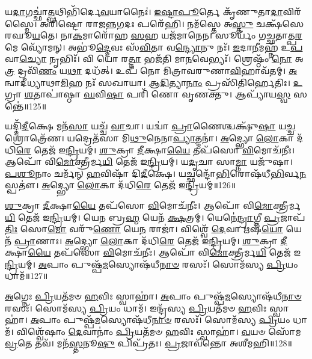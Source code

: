 𑌯\-\ul{𑌦𑌾}\-𑌗𑌚𑍍𑌛𑌾॑\-\ul{𑌤𑍍𑌪}\-𑌥𑌿𑌭𑌿᳴𑌰𑍍𑌦𑍇\-\ul{𑌵}\-𑌯𑌾𑌨𑍈𑌃॑।
\-\ul{𑌇}\-\-\ul{𑌷𑍍𑌟𑌾}\-\-\ul{𑌪𑍂}\-𑌰𑍍𑌤𑍇 𑌕𑍃᳴𑌣𑍁𑌤𑌾\-\ul{𑌦𑌾}\-𑌵𑌿𑌰᳴𑌸𑍍𑌮𑍈।
𑌅𑌰𑌿᳴𑌷𑍍𑌟𑍋 𑌰𑌾𑌜𑌨𑍍𑌨\-\ul{𑌗}\-𑌦𑌃 𑌪𑌰𑍇᳴𑌹𑌿।
𑌨𑌮᳴𑌸𑍍𑌤𑍇 𑌅\-\ul{𑌸𑍍𑌤𑍁} 𑌚𑌕𑍍𑌷᳴𑌸𑍇 𑌰𑌘𑍂\-\ul{𑌯}\-𑌤𑍇।
𑌨𑌾\-\ul{𑌕}\-𑌮𑌾𑌰𑍋᳴𑌹 \ul{𑌸}\-𑌹 𑌯𑌜᳴𑌮𑌾𑌨𑍇𑌨।
𑌸𑍂𑌰𑍍𑌯𑌂᳴ 𑌗𑌚𑍍𑌛𑌤𑌾𑌤𑍍𑌪\-\ul{𑌰}\-𑌮𑍇 𑌵𑍍𑌯𑍋᳴𑌮𑌨𑍍।
𑌅𑌭𑍂॑\-\ul{𑌦𑍍𑌦𑍇}\-𑌵𑌃 𑌸᳴\-\ul{𑌵𑌿}\-𑌤𑌾 𑌵\-\ul{𑌨𑍍𑌦𑍍𑌯𑍋}\-𑌨𑍁 𑌨𑌃᳴।
\-\ul{𑌇}\-𑌦𑌾\-\ul{𑌨𑍀}\-𑌮𑌹𑍍𑌨᳴ 𑌉\-\ul{𑌪}\-𑌵𑌾\-\ul{𑌚𑍍𑌯𑍋} 𑌨𑍃𑌭𑌿𑌃᳴।
𑌵𑌿 𑌯𑍋 𑌰\-\ul{𑌤𑍍𑌨𑌾} 𑌭𑌜᳴𑌤𑌿 𑌮𑌾\-\ul{𑌨}\-𑌵𑍇𑌭𑍍𑌯𑌃᳴।
𑌶𑍍𑌰𑍇𑌷𑍍𑌠𑌂᳴ \ul{𑌨𑍋} 𑌅\-\ul{𑌤𑍍𑌰} 𑌦𑍍𑌰𑌵𑌿᳴\-\ul{𑌣𑌂} 𑌯\-\ul{𑌥𑌾} 𑌦𑌧᳴𑌤𑍍।
𑌉𑌪᳴ 𑌨𑍋 𑌮𑌿𑌤𑍍𑌰𑌾𑌵𑌰𑍁𑌣𑌾\-\ul{𑌵𑌿}\-𑌹𑌾𑌵᳴𑌤𑌮𑍍।
\-\ul{𑌅}\-𑌨𑍍𑌵𑌾𑌦𑍀॑𑌧𑍍𑌯𑌾𑌥𑌾\-\ul{𑌮𑌿}\-𑌹 𑌨𑌃᳴ 𑌸𑌖𑌾𑌯𑌾।
\-\ul{𑌆}\-\-\ul{𑌦𑌿}\-𑌤𑍍𑌯𑌾\-\ul{𑌨𑌾𑌂} 𑌪𑍍𑌰𑌸𑌿᳴𑌤𑌿𑌰𑍍\mbox{}\-\ul{𑌹𑍇}\-𑌤𑌿𑌃।
\-\ul{𑌉}\-𑌗𑍍𑌰𑌾 \ul{𑌶}\-𑌤𑌾𑌪𑌾॑𑌷𑍍𑌠𑌾 \ul{𑌘}\-𑌵𑌿\-\ul{𑌷𑌾} 𑌪𑌰𑌿᳴ 𑌣𑍋 𑌵𑍃𑌣𑌕𑍍𑌤𑍁।
𑌆𑌪𑍍𑌯𑌾᳴𑌯\-\ul{𑌸𑍍𑌵} 𑌸𑌨𑍍𑌤𑍇॑॥125॥\anuvakamend[𑌤𑍍𑌮\-\ul{𑌨𑌾} 𑌜𑌾𑌯᳴𑌮𑌾𑌨𑍋\-𑌽\-\ul{𑌸𑍍𑌯} 𑌦\-\ul{𑌧}\-𑌤𑍍𑌪𑌞𑍍𑌚᳴ 𑌚]

𑌯𑌦𑍍𑌦𑌿᳴\-\ul{𑌦𑍀}\-𑌕𑍍𑌷𑍇 𑌮𑌨᳴\-\ul{𑌸𑌾} 𑌯𑌚𑍍𑌚᳴ \ul{𑌵𑌾}\-𑌚𑌾।
𑌯𑌦𑍍𑌵𑌾॑ \ul{𑌪𑍍𑌰𑌾}\-𑌣𑍈𑌶𑍍𑌚𑌕𑍍𑌷𑍁᳴\-\ul{𑌷𑌾} 𑌯\-\ul{𑌚𑍍𑌚} 𑌶𑍍𑌰𑍋𑌤𑍍𑌰𑍇᳴𑌣।
𑌯𑌦𑍍𑌰𑍇𑌤᳴𑌸𑌾 𑌮𑌿\-\ul{𑌥𑍁}\-𑌨𑍇𑌨𑌾\-\ul{𑌪𑍍𑌯𑌾}\-𑌤𑍍𑌮𑌨𑌾॑।
\-\ul{𑌅}\-𑌦𑍍𑌭𑍍𑌯𑍋 \ul{𑌲𑍋}\-𑌕𑌾 𑌦᳴𑌧𑌿\-\ul{𑌰𑍇} 𑌤𑍇𑌜᳴ 𑌇\-\ul{𑌨𑍍𑌦𑍍𑌰𑌿}\-𑌯𑌮𑍍।
\-\ul{𑌶𑍁}\-𑌕𑍍𑌰𑌾 \ul{𑌦𑍀}\-𑌕𑍍𑌷𑌾\-\ul{𑌯𑍈} 𑌤𑌪᳴𑌸𑍋 \ul{𑌵𑌿}\-𑌮𑍋𑌚᳴𑌨𑍀𑌃।
𑌆𑌪𑍋᳴ 𑌵𑌿\-\ul{𑌮𑍋}\-𑌕𑍍𑌤𑍍𑌰𑍀𑌰𑍍𑌮\-\ul{𑌯𑌿} 𑌤𑍇𑌜᳴ 𑌇\-\ul{𑌨𑍍𑌦𑍍𑌰𑌿}\-𑌯𑌮𑍍।
𑌯\-\ul{𑌦𑍃}\-𑌚𑌾 𑌸𑌾\-\ul{𑌮𑍍𑌨𑌾} 𑌯𑌜𑍁᳴𑌷𑌾।
\-\ul{𑌪}\-\-\ul{𑌶𑍂}\-𑌨𑌾𑌂 𑌚𑌰𑍍𑌮᳴𑌨𑍍 \ul{𑌹}\-𑌵𑌿𑌷𑌾᳴ 𑌦𑌿\-\ul{𑌦𑍀}\-𑌕𑍍𑌷𑍇।
𑌯𑌚𑍍𑌛𑌨𑍍𑌦𑍋᳴\-\ul{𑌭𑌿}\-𑌰𑍋𑌷᳴𑌧𑍀\-\ul{𑌭𑌿}\-𑌰𑍍𑌵\-\ul{𑌨}\-𑌸𑍍𑌪𑌤𑍗॑।
\-\ul{𑌅}\-𑌦𑍍𑌭𑍍𑌯𑍋 \ul{𑌲𑍋}\-𑌕𑌾 𑌦᳴𑌧𑌿\-\ul{𑌰𑍇} 𑌤𑍇𑌜᳴ 𑌇\-\ul{𑌨𑍍𑌦𑍍𑌰𑌿}\-𑌯𑌮𑍍॥126॥

\-\ul{𑌶𑍁}\-𑌕𑍍𑌰𑌾 \ul{𑌦𑍀}\-𑌕𑍍𑌷𑌾\-\ul{𑌯𑍈} 𑌤𑌪᳴𑌸𑍋 \ul{𑌵𑌿}\-𑌮𑍋𑌚᳴𑌨𑍀𑌃।
𑌆𑌪𑍋᳴ 𑌵𑌿\-\ul{𑌮𑍋}\-𑌕𑍍𑌤𑍍𑌰𑍀𑌰𑍍𑌮\-\ul{𑌯𑌿} 𑌤𑍇𑌜᳴ 𑌇\-\ul{𑌨𑍍𑌦𑍍𑌰𑌿}\-𑌯𑌮𑍍।
𑌯𑍇\-\ul{𑌨} 𑌬𑍍𑌰\-\ul{𑌹𑍍𑌮} 𑌯𑍇𑌨᳴ \ul{𑌕𑍍𑌷}\-𑌤𑍍𑌰𑌮𑍍।
𑌯𑍇𑌨𑍇॑\-\ul{𑌨𑍍𑌦𑍍𑌰𑌾}\-𑌗𑍍𑌨𑍀 \ul{𑌪𑍍𑌰}\-𑌜𑌾\-𑌪᳴\-\ul{𑌤𑌿𑌃} 𑌸𑍋\-\ul{𑌮𑍋} 𑌵𑌰𑍁᳴\-\ul{𑌣𑍋} 𑌯𑍇\-\ul{𑌨} 𑌰𑌾𑌜𑌾॑।
𑌵𑌿𑌶𑍍𑌵𑍇᳴ \ul{𑌦𑍇}\-𑌵𑌾 𑌋𑌷᳴\-\ul{𑌯𑍋} 𑌯𑍇𑌨᳴ \ul{𑌪𑍍𑌰𑌾}\-𑌣𑌾𑌃।
\-\ul{𑌅}\-𑌦𑍍𑌭𑍍𑌯𑍋 \ul{𑌲𑍋}\-𑌕𑌾 𑌦᳴𑌧𑌿\-\ul{𑌰𑍇} 𑌤𑍇𑌜᳴ 𑌇\-\ul{𑌨𑍍𑌦𑍍𑌰𑌿}\-𑌯𑌮𑍍।
\-\ul{𑌶𑍁}\-𑌕𑍍𑌰𑌾 \ul{𑌦𑍀}\-𑌕𑍍𑌷𑌾\-\ul{𑌯𑍈} 𑌤𑌪᳴𑌸𑍋 \ul{𑌵𑌿}\-𑌮𑍋𑌚᳴𑌨𑍀𑌃।
𑌆𑌪𑍋᳴ 𑌵𑌿\-\ul{𑌮𑍋}\-𑌕𑍍𑌤𑍍𑌰𑍀𑌰𑍍𑌮\-\ul{𑌯𑌿} 𑌤𑍇𑌜᳴ 𑌇\-\ul{𑌨𑍍𑌦𑍍𑌰𑌿}\-𑌯𑌮𑍍।
\-\ul{𑌅}\-𑌪𑌾𑌂 𑌪𑍁𑌷𑍍𑌪᳴\-\ul{𑌮}\-𑌸𑍍𑌯𑍋𑌷᳴𑌧𑍀\-\ul{𑌨𑌾}\-\-\ul{𑍞} 𑌰𑌸𑌃᳴।
𑌸𑍋𑌮᳴𑌸𑍍𑌯 \ul{𑌪𑍍𑌰𑌿}\-𑌯𑌂 𑌧𑌾𑌮᳴॥127॥

\-\ul{𑌅}\-𑌗𑍍𑌨𑍇𑌃 \ul{𑌪𑍍𑌰𑌿}\-𑌯𑌤᳴𑌮𑍞 \ul{𑌹}\-𑌵𑌿𑌃 𑌸𑍍𑌵𑌾𑌹𑌾॑।
\-\ul{𑌅}\-𑌪𑌾𑌂 𑌪𑍁𑌷𑍍𑌪᳴\-\ul{𑌮}\-𑌸𑍍𑌯𑍋𑌷᳴𑌧𑍀\-\ul{𑌨𑌾}\-\-\ul{𑍞} 𑌰𑌸𑌃᳴।
𑌸𑍋𑌮᳴𑌸𑍍𑌯 \ul{𑌪𑍍𑌰𑌿}\-𑌯𑌂 𑌧𑌾𑌮᳴।
𑌇𑌨𑍍𑌦𑍍𑌰᳴𑌸𑍍𑌯 \ul{𑌪𑍍𑌰𑌿}\-𑌯𑌤᳴𑌮𑍞 \ul{𑌹}\-𑌵𑌿𑌃 𑌸𑍍𑌵𑌾𑌹𑌾॑।
\-\ul{𑌅}\-𑌪𑌾𑌂 𑌪𑍁𑌷𑍍𑌪᳴\-\ul{𑌮}\-𑌸𑍍𑌯𑍋𑌷᳴𑌧𑍀\-\ul{𑌨𑌾}\-\-\ul{𑍞} 𑌰𑌸𑌃᳴।
𑌸𑍋𑌮᳴𑌸𑍍𑌯 \ul{𑌪𑍍𑌰𑌿}\-𑌯𑌂 𑌧𑌾𑌮᳴।
𑌵𑌿𑌶𑍍𑌵𑍇᳴𑌷𑌾𑌂 \ul{𑌦𑍇}\-𑌵𑌾𑌨𑌾𑌂॑ \ul{𑌪𑍍𑌰𑌿}\-𑌯𑌤᳴𑌮𑍞 \ul{𑌹}\-𑌵𑌿𑌃 𑌸𑍍𑌵𑌾𑌹𑌾॑।
\-\ul{𑌵}\-𑌯𑍞 𑌸𑍋᳴𑌮 \ul{𑌵𑍍𑌰}\-𑌤𑍇 𑌤𑌵᳴।
𑌮𑌨᳴\-\ul{𑌸𑍍𑌤}\-𑌨𑍂\-\ul{𑌷𑍁} 𑌪𑌿𑌪𑍍𑌰᳴𑌤𑌃।
\-\ul{𑌪𑍍𑌰}\-𑌜𑌾𑌵᳴𑌨𑍍𑌤𑍋 𑌅𑌶𑍀𑌮𑌹𑌿॥128॥

